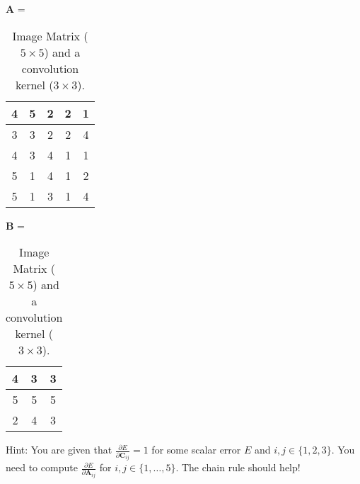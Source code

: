 \documentclass[11pt]{article}
\newcommand{\0}{\mat{0}}
\newcommand{\matr}[1]{\bm{#1}}     %
\begin{document}
 
\begin{table}[!ht]
    \centering
    $\matr{A}$ =  \begin{tabular}{|c|c|c|c|c|} 
    \hline
       4 & 5 & 2 & 2 & 1 \\ \hline 
       3 & 3 & 2 & 2 & 4 \\ \hline
       4 & 3 & 4 & 1 & 1 \\ \hline 
       5 & 1 & 4 & 1 & 2 \\ \hline
       5 & 1 & 3 & 1 & 4 \\ \hline
    \end{tabular}\hspace{1cm}
    $\matr{B}$ = \begin{tabular}{|c|c|c|} 
    \hline
       4 & 3 & 3 \\ \hline 
       5 & 5 & 5 \\ \hline
       2 & 4 & 3 \\ \hline 
    \end{tabular}
    \caption{Image Matrix ($5\times 5$) and a convolution kernel ($3\times 3$).}\label{tab1}   
\end{table}

 Hint: You are given that $\frac{\partial E}{\partial \matr{C}_{ij}} = 1$ for some scalar error $E$ and $i,j\in\{1,2,3\}$. You need to compute $\frac{\partial E}{\partial \matr{A}_{ij}}$ for  $i,j\in\{1, \ldots, 5\}$. The chain rule should help!
\end{document}
